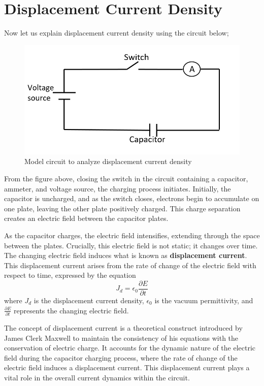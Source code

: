 \section{Displacement Current Density}
Now let us explain displacement current density using the circuit below;

\begin{figure}[h]
	\centering
	\includegraphics[width=.7\linewidth]{graphics/111}
	\caption{Model circuit to analyze displacement current density}
	\label{fig:displacement current density}
\end{figure} 
From the figure above, closing the switch in the circuit containing a capacitor, ammeter, and voltage source, the charging process initiates. Initially, the capacitor is uncharged, and as the switch closes, electrons begin to accumulate on one plate, leaving the other plate positively charged. This charge separation creates an electric field between the capacitor plates.

As the capacitor charges, the electric field intensifies, extending through the space between the plates. Crucially, this electric field is not static; it changes over time. The changing electric field induces what is known as \textbf{displacement current}. This displacement current arises from the rate of change of the electric field with respect to time, expressed by the equation
\[
J_d = \epsilon_0 \frac{\partial E}{\partial t}
\]
\begin{equation}\end{equation}
where \(J_d\) is the displacement current density, \(\epsilon_0\) is the vacuum permittivity, and \(\frac{\partial E}{\partial t}\) represents the changing electric field.

The concept of displacement current is a theoretical construct introduced by James Clerk Maxwell to maintain the consistency of his equations with the conservation of electric charge. It accounts for the dynamic nature of the electric field during the capacitor charging process, where the rate of change of the electric field induces a displacement current. This displacement current plays a vital role in the overall current dynamics within the circuit.

